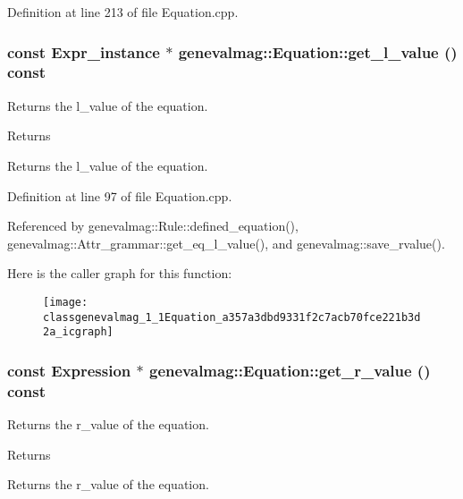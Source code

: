 Definition at line 213 of file Equation.cpp.

\hypertarget{classgenevalmag_1_1Equation_a357a3dbd9331f2c7acb70fce221b3d2a}{
\subsubsection[{get\_\-l\_\-value}]{\setlength{\rightskip}{0pt plus 5cm}const {\bf Expr\_\-instance} $\ast$ genevalmag::Equation::get\_\-l\_\-value () const}}
\label{classgenevalmag_1_1Equation_a357a3dbd9331f2c7acb70fce221b3d2a}
Returns the l\_\-value of the equation. \begin{DoxyReturn}{Returns}

\end{DoxyReturn}
Returns the l\_\-value of the equation. 

Definition at line 97 of file Equation.cpp.



Referenced by genevalmag::Rule::defined\_\-equation(), genevalmag::Attr\_\-grammar::get\_\-eq\_\-l\_\-value(), and genevalmag::save\_\-rvalue().



Here is the caller graph for this function:\nopagebreak
\begin{figure}[H]
\begin{center}
\leavevmode
\texttt{[image: classgenevalmag\_1\_1Equation\_a357a3dbd9331f2c7acb70fce221b3d2a\_icgraph]}
\end{center}
\end{figure}


\hypertarget{classgenevalmag_1_1Equation_a875d86207681edfa874a5fca11a671be}{
\subsubsection[{get\_\-r\_\-value}]{\setlength{\rightskip}{0pt plus 5cm}const {\bf Expression} $\ast$ genevalmag::Equation::get\_\-r\_\-value () const}}
\label{classgenevalmag_1_1Equation_a875d86207681edfa874a5fca11a671be}
Returns the r\_\-value of the equation. \begin{DoxyReturn}{Returns}

\end{DoxyReturn}
Returns the r\_\-value of the equation. 

